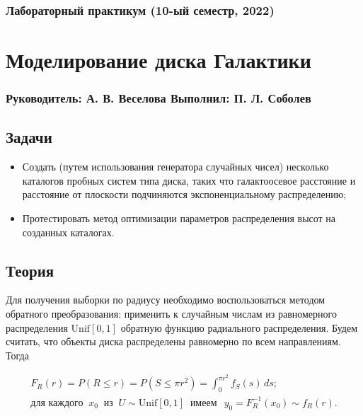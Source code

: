 \documentclass[a4paper, oneside]{article}
\newcommand{\su}{\vspace{-0.5em}}
\begin{document}
\subsubsection*{Лабораторный практикум (10-ый семестр, 2022)}
\section*{Моделирование диска Галактики}
\subsubsection*{Руководитель: А. В. Веселова \hspace{2em} Выполнил: П. Л. Соболев}

\vspace{3em}

\subsection*{Задачи}

\begin{itemize}
  \setlength\itemsep{-0.1em}
  \item Создать (путем использования генератора случайных чисел) несколько каталогов пробных систем типа диска, таких что галактоосевое расстояние и расстояние от плоскости подчиняются экспоненциальному распределению;
  \item Протестировать метод оптимизации параметров распределения высот на созданных каталогах.
\end{itemize}

\subsection*{Теория}

Для получения выборки по радиусу необходимо воспользоваться методом обратного преобразования: применить к случайным числам из равномерного распределения $ \mathrm{Unif}[0, 1] $ обратную функцию радиального распределения. Будем считать, что объекты диска распределены равномерно по всем направлениям. Тогда

\su
\begin{equation}
\begin{gathered}
  F_R(r) = P(R \leqslant r) = P(S \leqslant \pi r^2) = \int_{0}^{\pi r^2} f_S(s) \, ds; \\
  \textit{для каждого} \;\; x_0 \;\; \textit{из} \;\; U \sim \mathrm{Unif}[0, 1] \;\; \textit{имеем} \;\;\, y_0 = F^{-1}_R(x_0) \sim f_R(r).
\end{gathered}
\end{equation}
\end{document}
